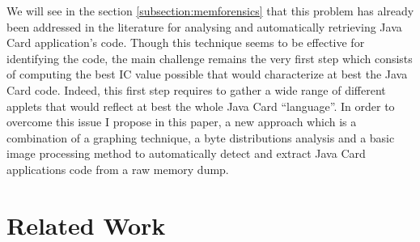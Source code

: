 We will see in the section \ref{subsection:memforensics} that this problem has already been
addressed in the literature for  analysing and automatically retrieving Java Card application's code.
Though this technique seems to be effective for identifying the code, the main challenge remains the very
first step which consists of computing the best IC value possible that would characterize at best
the Java Card code. Indeed, this first step requires to gather a wide range of different applets
that would reflect at best the whole Java Card ``language''. In order to overcome this issue
I propose in this paper, a new approach which is a combination of a graphing technique, a byte
distributions analysis and a basic image processing method to automatically detect and extract Java
Card applications code from a raw memory dump.


\section{Related Work}
\label{section:relatedwork}


